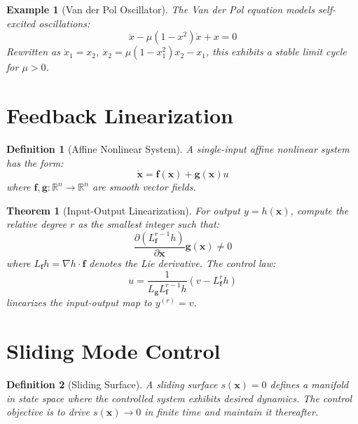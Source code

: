 \documentclass[a4paper, 11pt]{article}
\newtheorem{definition}{Definition}[section]
\newtheorem{theorem}{Theorem}[section]
\newtheorem{example}{Example}[section]
\begin{document}
\begin{example}[Van der Pol Oscillator]
The Van der Pol equation models self-excited oscillations:
\begin{equation}
\ddot{x} - \mu(1 - x^2)\dot{x} + x = 0
\end{equation}
Rewritten as $\dot{x}_1 = x_2$, $\dot{x}_2 = \mu(1 - x_1^2)x_2 - x_1$, this exhibits a stable
limit cycle for $\mu > 0$.
\end{example}

\section{Feedback Linearization}

\begin{definition}[Affine Nonlinear System]
A single-input affine nonlinear system has the form:
\begin{equation}
\dot{\mathbf{x}} = \mathbf{f}(\mathbf{x}) + \mathbf{g}(\mathbf{x})u
\end{equation}
where $\mathbf{f}, \mathbf{g}: \mathbb{R}^n \rightarrow \mathbb{R}^n$ are smooth vector fields.
\end{definition}

\begin{theorem}[Input-Output Linearization]
For output $y = h(\mathbf{x})$, compute the relative degree $r$ as the smallest integer such that:
\begin{equation}
\frac{\partial (L_{\mathbf{f}}^{r-1} h)}{\partial \mathbf{x}} \mathbf{g}(\mathbf{x}) \neq 0
\end{equation}
where $L_{\mathbf{f}} h = \nabla h \cdot \mathbf{f}$ denotes the Lie derivative. The control law:
\begin{equation}
u = \frac{1}{L_{\mathbf{g}} L_{\mathbf{f}}^{r-1} h} \left( v - L_{\mathbf{f}}^r h \right)
\end{equation}
linearizes the input-output map to $y^{(r)} = v$.
\end{theorem}

\section{Sliding Mode Control}

\begin{definition}[Sliding Surface]
A sliding surface $s(\mathbf{x}) = 0$ defines a manifold in state space where the controlled
system exhibits desired dynamics. The control objective is to drive $s(\mathbf{x}) \rightarrow 0$
in finite time and maintain it thereafter.
\end{definition}
\end{document}
